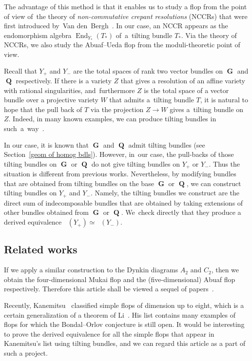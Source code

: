 \documentclass[pdftex]{sigma}
\DeclareMathOperator{\D}{D^b}
\DeclareMathOperator{\End}{End}
\DeclareMathOperator{\G}{\mathbf{G}}
\DeclareMathOperator{\Q}{\mathbf{Q}}
\numberwithin{equation}{section}
\begin{document}
The advantage of this method is that it enables us to study a flop
from the point of view of~the theory of \textit{non-commutative crepant resolutions} (NCCRs)
that were first introduced by~Van den~Bergh~\cite{VdB04b}.
In our case, an NCCR appears as the endomorphism algebra $\End_{Y_{\ast}}(T_{\ast})$ of~a~til\-ting bundle $T_{\ast}$.
Via the theory of NCCRs, we also study the Abuaf--Ueda flop from the moduli-theoretic point of view.

Recall that $Y_+$ and $Y_-$ are the total spaces of rank two vector bundles on $\G$ and $\Q$ respectively.
If there is a variety $Z$ that gives a resolution of an affine variety with rational singularities, and~furthermore
$Z$ is the total space of a vector bundle over a projective variety $W$ that admits a~tilting bundle $T$,
it is natural to hope that the pull back of $T$ via the projection $Z \to W$ gives a~tilting bundle on $Z$.
Indeed, in many known examples, we can produce tilting bundles in such~a~way~\cite{BLV10, H17a, WZ12}.

In our case, it is known that $\G$ and $\Q$ admit tilting bundles (see Section~\ref{geom of homog bdls}).
However, in~our case, the pull-backs of those tilting bundles on $\G$ or $\Q$ do not give tilting bundles on $Y_+$ or $Y_-$.
Thus the situation is different from previous works.
Nevertheless, by modifying bundles that are obtained from tilting bundles on the base $\G$ or $\Q$,
we can construct tilting bundles on $Y_+$ and $Y_-$.
Namely, the tilting bundles we construct are the direct sum of indecomposable bundles that are obtained by taking extensions of
other bundles obtained from $\G$ or $\Q$.
We~check directly that they produce a derived equivalence $\D(Y_+) \simeq \D(Y_-)$.



\subsection{Related works}
If we apply a similar construction to the Dynkin diagrams $A_2$ and $C_2$,
then we obtain the four-dimensional Mukai flop and the (five-dimensional) Abuaf flop~\cite{Seg16} respectively.
Therefore this article shall be viewed a sequel of papers~\cite{H17a, H17b, Seg16}.

Recently, Kanemitsu~\cite{Kan17} classified simple flops of dimension up to eight, which is a certain generalization of a theorem of Li~\cite{Li17}.
His list contains many examples of flops for which the Bondal--Orlov conjecture is still open.
It would be interesting to prove the derived equivalence for all the simple flops that appear in Kanemitsu's list using tilting bundles,
and we can regard this article as a part of such a project.
\end{document}
